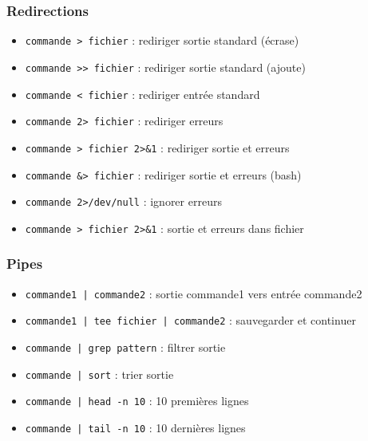 \documentclass[12pt,a4paper]{article}
\begin{document}
\subsubsection{Redirections}
\begin{itemize}
    \item \texttt{commande > fichier} : rediriger sortie standard (\'ecrase) %
    \item \texttt{commande >> fichier} : rediriger sortie standard (ajoute) %
    \item \texttt{commande < fichier} : rediriger entr\'ee standard %
    \item \texttt{commande 2> fichier} : rediriger erreurs %
    \item \texttt{commande > fichier 2>\&1} : rediriger sortie et erreurs %
    \item \texttt{commande \&> fichier} : rediriger sortie et erreurs (bash) %
    \item \texttt{commande 2>/dev/null} : ignorer erreurs %
    \item \texttt{commande > fichier 2>\&1} : sortie et erreurs dans fichier %
\end{itemize}

\subsubsection{Pipes}
\begin{itemize}
    \item \texttt{commande1 | commande2} : sortie commande1 vers entr\'ee commande2 %
    \item \texttt{commande1 | tee fichier | commande2} : sauvegarder et continuer %
    \item \texttt{commande | grep pattern} : filtrer sortie %
    \item \texttt{commande | sort} : trier sortie %
    \item \texttt{commande | head -n 10} : 10 premi\`eres lignes %
    \item \texttt{commande | tail -n 10} : 10 derni\`eres lignes %
\end{itemize}

\end{document}
